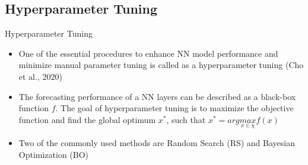 \documentclass[aspectratio=169]{beamer}
\begin{document}
\subsection{Hyperparameter Tuning}
\begin{frame}{Hyperparameter Tuning}
\begin{itemize}
    \item One of the essential procedures to enhance NN model performance and minimize manual parameter tuning is called as a hyperparameter tuning (Cho et al., 2020)
    \item The forecasting performance of a NN layers can be described as a black-box function $f$. The goal of hyperparameter tuning is to maximize the objective function and find the global optimum $x^{*}$, such that $x^{*}= arg \underset{x \in \chi}{max} f(x)$
    \item Two of the commonly used methods are Random Search (RS) and Bayesian Optimization (BO)
\end{itemize}
\end{frame}

\end{document}
